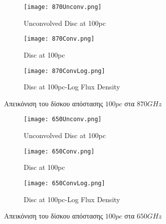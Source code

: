 \begin{figure}[h]
\centering
 \begin{subfigure}{0.33\textwidth}
  \centering
  \texttt{[image: 870Unconv.png]}
  \caption{{\en Unconvolved Disc at 100pc}}\label{fig:870gHzUnconvolved}
 \end{subfigure}\hfill
 \begin{subfigure}{0.33\textwidth}
  \centering
  \texttt{[image: 870Conv.png]}
  \caption{{\en Disc at 100pc}}\label{fig:870gHzCOnvolved}
 \end{subfigure}\hfill
 \begin{subfigure}{0.33\textwidth}
  \centering
  \texttt{[image: 870ConvLog.png]}
  \caption{{\en Disc at 100pc-Log Flux Density}}\label{fig:Log870gHzCOnvolved}
 \end{subfigure}\hfill
  \caption{Απεικόνιση του δίσκου απόστασης $100pc$ στα $870GHz$}
\medskip
\centering
 \begin{subfigure}{0.33\textwidth}
  \centering
  \texttt{[image: 650Unconv.png]}
  \caption{{\en Unconvolved Disc at 100pc}}\label{fig:650gHzUnconvolved}
 \end{subfigure}\hfill
 \begin{subfigure}{0.33\textwidth}
  \centering
  \texttt{[image: 650Conv.png]}
  \caption{{\en Disc at 100pc}}\label{fig:650gHzCOnvolved}
 \end{subfigure}\hfill
 \begin{subfigure}{0.33\textwidth}
  \centering
  \texttt{[image: 650ConvLog.png]}
  \caption{{\en Disc at 100pc-Log Flux Density}}\label{fig:Log650gHzCOnvolved}
 \end{subfigure}\hfill
  \caption{Απεικόνιση του δίσκου απόστασης $100pc$ στα $650GHz$}
\end{figure}

\newpage

